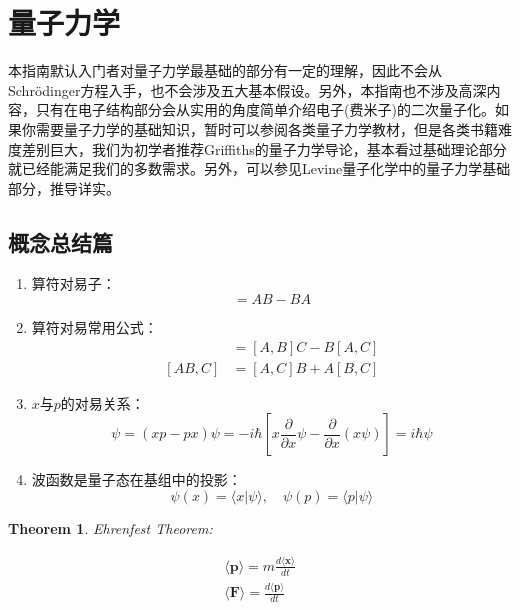 \documentclass{article}
\newtheorem{theorem}{Theorem}[section]
\numberwithin{equation}{section}
\newcommand{\mean}[1]{\langle #1 \rangle}
\begin{document}
  \section{量子力学}
  本指南默认入门者对量子力学最基础的部分有一定的理解，因此不会从Schr\"odinger方程入手，也不会涉及五大基本假设。另外，本指南也不涉及高深内容，只有在电子结构部分会从实用的角度简单介绍电子(费米子)的二次量子化。如果你需要量子力学的基础知识，暂时可以参阅各类量子力学教材，但是各类书籍难度差别巨大，我们为初学者推荐Griffiths的量子力学导论，基本看过基础理论部分就已经能满足我们的多数需求。另外，可以参见Levine量子化学中的量子力学基础部分，推导详实。

  \subsection{概念总结篇}
    \begin{enumerate}
    \item 算符对易子：
  \begin{equation}
  [A,B] = AB - BA
  \end{equation}

  \item 算符对易常用公式：
  \begin{align}
  [A,BC]& = [A,B]C - B[A,C]\\
  [AB,C]& = [A,C]B + A[B,C]
  \end{align}

  \item $x$与$p$的对易关系：
  \begin{equation}
  [x,p]\psi=(xp-px)\psi = -i\hbar[x \frac{\partial}{\partial x}\psi-\frac{\partial}{\partial x}(x\psi)]= i\hbar \psi
  \end{equation}

  \item 波函数是量子态在基组中的投影：
  \begin{equation}
  \psi (x) = \langle x | \psi \rangle , \quad \psi(p) = \langle p | \psi \rangle
  \end{equation} 
\end{enumerate}
  

\begin{theorem}
Ehrenfest Theorem:

\begin{align}
\mean{\textbf{p}}= m \frac{d \mean{\textbf{x}}}{dt}\\
\mean{\textbf{F}}= \frac{d\mean{\textbf{p}}}{dt}
\end{align}
\end{theorem}
\end{document}
